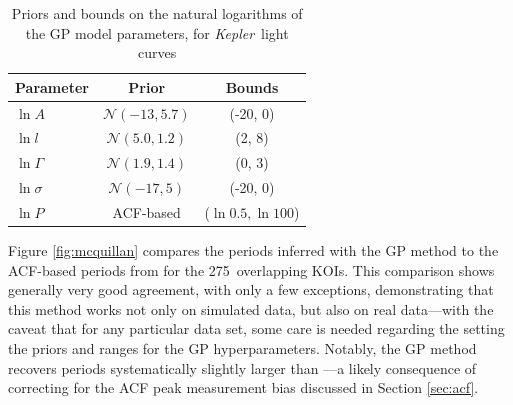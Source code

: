 \documentclass[useAMS, usenatbib, preprint, 12pt]{aastex}
\newcommand{\Kepler}{{\it Kepler}}
\newcommand{\nkoimcq}{275}
\begin{document}
\begin{table}
\begin{center}
\caption{Priors and bounds on the natural logarithms of the GP model parameters,
        for \Kepler\ light curves}
\begin{tabular}{lcc}
Parameter & Prior & Bounds\\
    \hline
    $\ln A$ & $\mathcal N(-13, 5.7)$ & (-20, 0) \\
    $\ln l$ & $\mathcal N(5.0, 1.2)$ & (2, 8) \\
    $\ln \Gamma$ & $\mathcal N(1.9, 1.4)$ & (0, 3) \\
    $\ln \sigma$ & $\mathcal N(-17, 5)$ & (-20, 0) \\
    $\ln P $ & ACF-based & ($\ln 0.5, \ln 100$) \\
\end{tabular}
\end{center}
\end{table}
\label{tab:koipriors}

Figure \ref{fig:mcquillan} compares the periods inferred with the GP method to
the ACF-based periods from \citet{Mcquillan2013} for the \nkoimcq\ overlapping
KOIs.
This comparison shows generally very good agreement, with only a few
exceptions, demonstrating that this method works not only on simulated data,
but also on real data---with the caveat that for any particular data set, some
care is needed regarding the setting the priors and ranges for the GP
hyperparameters.
Notably, the GP method recovers periods
systematically slightly larger than \citet{Mcquillan2013}---a likely consequence
of correcting for the ACF peak measurement bias discussed in Section \ref{sec:acf}.
\end{document}
